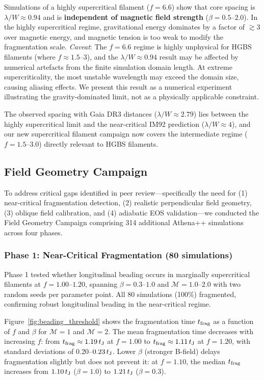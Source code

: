 \documentclass[twocolumn,longtitle,usenatbib]{mnras}
\begin{document}
Simulations of a highly supercritical filament ($f = 6.6$) show that core spacing is $\lambda/W \approx 0.94$ and is \textbf{independent of magnetic field strength} ($\beta = 0.5$--$2.0$). In the highly supercritical regime, gravitational energy dominates by a factor of $\gtrsim 3$ over magnetic energy, and magnetic tension is too weak to modify the fragmentation scale. \textit{Caveat}: The $f = 6.6$ regime is highly unphysical for HGBS filaments (where $f \approx 1.5$--$3$), and the $\lambda/W \approx 0.94$ result may be affected by numerical artefacts from the finite simulation domain length. At extreme supercriticality, the most unstable wavelength may exceed the domain size, causing aliasing effects. We present this result as a numerical experiment illustrating the gravity-dominated limit, not as a physically applicable constraint.

The observed spacing with Gaia DR3 distances ($\lambda/W \approx 2.79$) lies between the highly supercritical limit and the near-critical IM92 prediction ($\lambda/W \approx 4$), and our new supercritical filament campaign now covers the intermediate regime ($f = 1.5$--$3.0$) directly relevant to HGBS filaments.

\subsection{Field Geometry Campaign}
\label{sec:fieldgeo}

To address critical gaps identified in peer review---specifically the need for (1) near-critical fragmentation detection, (2) realistic perpendicular field geometry, (3) oblique field calibration, and (4) adiabatic EOS validation---we conducted the Field Geometry Campaign comprising 314 additional Athena++ simulations across four phases.

\subsubsection{Phase 1: Near-Critical Fragmentation (80 simulations)}

Phase 1 tested whether longitudinal beading occurs in marginally supercritical filaments at $f = 1.00$--$1.20$, spanning $\beta = 0.3$--$1.0$ and $\mathcal{M} = 1.0$--$2.0$ with two random seeds per parameter point. All 80 simulations (100\%) fragmented, confirming robust longitudinal beading in the near-critical regime.

Figure~\ref{fig:beading_threshold} shows the fragmentation time $t_{\rm frag}$ as a function of $f$ and $\beta$ for $\mathcal{M} = 1$ and $\mathcal{M} = 2$. The mean fragmentation time decreases with increasing $f$: from $t_{\rm frag} \approx 1.19\,t_{\rm J}$ at $f = 1.00$ to $t_{\rm frag} \approx 1.11\,t_{\rm J}$ at $f = 1.20$, with standard deviations of $0.20$--$0.23\,t_{\rm J}$. Lower $\beta$ (stronger B-field) delays fragmentation slightly but does not prevent it: at $f = 1.10$, the median $t_{\rm frag}$ increases from $1.10\,t_{\rm J}$ ($\beta = 1.0$) to $1.21\,t_{\rm J}$ ($\beta = 0.3$).
\end{document}

